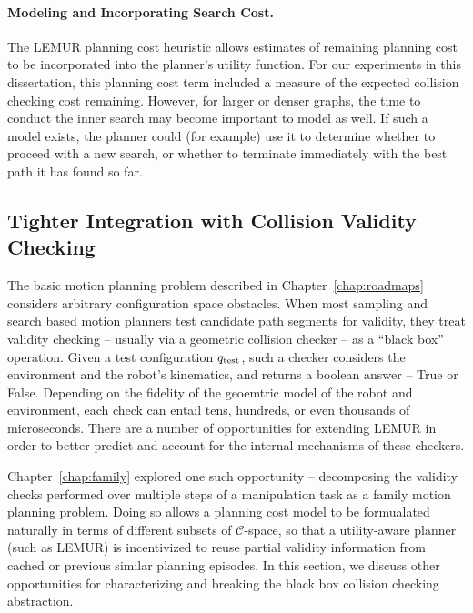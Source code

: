 \paragraph{Modeling and Incorporating Search Cost.}
The LEMUR planning cost heuristic allows estimates of remaining
planning cost to be incorporated into the planner's utility function.
For our experiments in this dissertation,
this planning cost term included a measure of the expected
collision checking cost remaining.
However,
for larger or denser graphs,
the time to conduct the inner search may become important to model
as well.
If such a model exists,
the planner could (for example) use it to determine
whether to proceed with a new search,
or whether to terminate immediately with the best path it has
found so far.

\subsection{Tighter Integration with Collision Validity Checking}

The basic motion planning problem described in Chapter~\ref{chap:roadmaps}
considers arbitrary configuration space obstacles.
When most sampling and search based motion planners test
candidate path segments for validity,
they treat validity checking
-- usually via a geometric collision checker --
as a ``black box'' operation.
Given a test configuration $q_{\mbox{\scriptsize test}}$,
such a checker considers the environment
and the robot's kinematics,
and returns a boolean answer -- True or False.
Depending on the fidelity of the geoemtric model of the robot
and environment,
each check can entail tens, hundreds, or even thousands
of microseconds.
There are a number of opportunities for extending LEMUR in order
to better predict and account for the internal mechanisms of these
checkers.

Chapter~\ref{chap:family} explored one such opportunity --
decomposing the validity checks performed over multiple steps of
a manipulation task as a family motion planning problem.
Doing so allows a planning cost model to be formualated naturally
in terms of different subsets of $\mathcal{C}$-space,
so that a utility-aware planner (such as LEMUR)
is incentivized to reuse partial validity information
from cached or previous similar planning episodes.
In this section,
we discuss other opportunities for characterizing and breaking
the black box collision checking abstraction.

